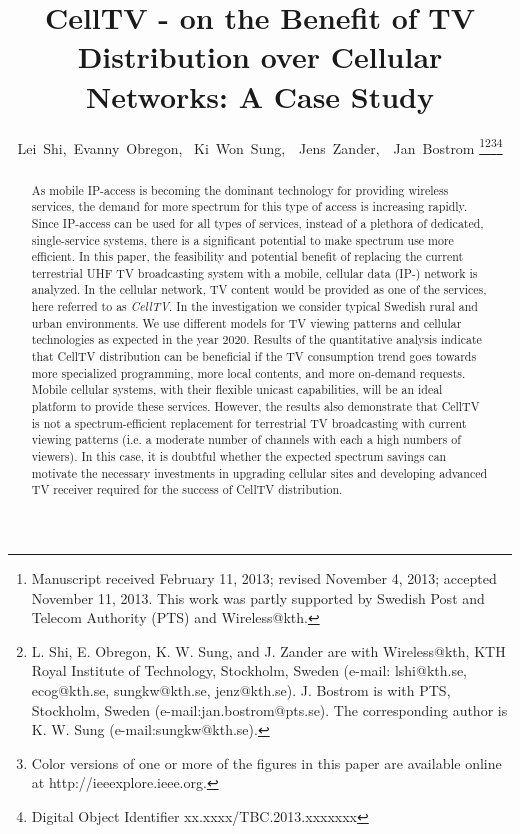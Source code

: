 \documentclass[journal]{IEEEtran}
\begin{document}
\title{CellTV - on the Benefit of TV Distribution over Cellular Networks: A Case Study}

\author{Lei~Shi,~Evanny~Obregon,
        ~Ki~Won~Sung,~~Jens~Zander,~~Jan~Bostrom
\thanks{Manuscript received February 11, 2013; revised November 4, 2013; accepted November 11, 2013. This work was partly supported by Swedish Post and Telecom Authority (PTS) and Wireless@kth.}\thanks{L. Shi, E. Obregon, K. W. Sung, and J. Zander are with Wireless@kth, KTH Royal Institute of Technology, Stockholm, Sweden (e-mail: lshi@kth.se, ecog@kth.se, sungkw@kth.se, jenz@kth.se). J. Bostrom is with PTS, Stockholm, Sweden (e-mail:jan.bostrom@pts.se). The corresponding author is K. W. Sung (e-mail:sungkw@kth.se).}\thanks{Color versions of one or more of the figures in this paper are available online at http://ieeexplore.ieee.org.}\thanks{Digital Object Identifier xx.xxxx/TBC.2013.xxxxxxx}}


\maketitle
\begin{abstract}
As mobile IP-access is becoming the dominant technology for providing wireless services, the demand for more spectrum for this type of access is increasing rapidly. Since IP-access can be used for all types of services, instead of a plethora of dedicated, single-service systems, there is a significant potential to make spectrum use more efficient. In this paper, the feasibility and potential benefit of replacing the current terrestrial UHF TV broadcasting system with a mobile, cellular data (IP-) network is analyzed. In the cellular network, TV content would be provided as {one} of the services, here referred to as \textit{CellTV}. In the investigation we consider typical Swedish rural and urban environments. We use different models for TV viewing patterns and cellular technologies as expected in the year 2020. Results of the quantitative analysis indicate that CellTV distribution can be beneficial if the TV consumption trend goes towards more specialized programming, more local contents, and more on-demand requests. Mobile cellular systems, with their flexible unicast capabilities, will be an ideal platform to provide these services. However, the results also demonstrate that CellTV is not a spectrum-efficient replacement for terrestrial TV broadcasting with current viewing patterns (i.e. a moderate number of channels with each a high numbers of viewers). In this case, it is doubtful whether the expected spectrum savings can motivate the necessary investments in upgrading cellular sites and developing advanced TV receiver required for the success of CellTV distribution.
\end{abstract}
\end{document}
